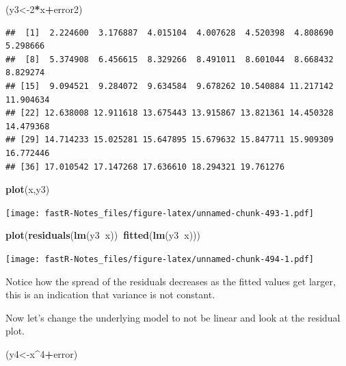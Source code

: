 \documentclass[]{book}
\newenvironment{Shaded}{\begin{snugshade}}{\end{snugshade}}
\newcommand{\KeywordTok}[1]{\textcolor[rgb]{0.13,0.29,0.53}{\textbf{#1}}}
\newcommand{\DecValTok}[1]{\textcolor[rgb]{0.00,0.00,0.81}{#1}}
\newcommand{\OperatorTok}[1]{\textcolor[rgb]{0.81,0.36,0.00}{\textbf{#1}}}
\newcommand{\NormalTok}[1]{#1}
\theoremstyle{definition}
\theoremstyle{definition}
\theoremstyle{definition}
\theoremstyle{remark}
\begin{document}
\begin{Shaded}
\begin{Highlighting}[]
\NormalTok{(y3<-}\DecValTok{2}\OperatorTok{*}\NormalTok{x}\OperatorTok{+}\NormalTok{error2)}
\end{Highlighting}
\end{Shaded}

\begin{verbatim}
##  [1]  2.224600  3.176887  4.015104  4.007628  4.520398  4.808690  5.298666
##  [8]  5.374908  6.456615  8.329266  8.491011  8.601044  8.668432  8.829274
## [15]  9.094521  9.284072  9.634584  9.678262 10.540884 11.217142 11.904634
## [22] 12.638008 12.911618 13.675443 13.915867 13.821361 14.450328 14.479368
## [29] 14.714233 15.025281 15.647895 15.679632 15.847711 15.909309 16.772446
## [36] 17.010542 17.147268 17.636610 18.294321 19.761276
\end{verbatim}

\begin{Shaded}
\begin{Highlighting}[]
\KeywordTok{plot}\NormalTok{(x,y3)}
\end{Highlighting}
\end{Shaded}

\texttt{[image: fastR-Notes\_files/figure-latex/unnamed-chunk-493-1.pdf]}

\begin{Shaded}
\begin{Highlighting}[]
\KeywordTok{plot}\NormalTok{(}\KeywordTok{residuals}\NormalTok{(}\KeywordTok{lm}\NormalTok{(y3}\OperatorTok{~}\NormalTok{x))}\OperatorTok{~}\KeywordTok{fitted}\NormalTok{(}\KeywordTok{lm}\NormalTok{(y3}\OperatorTok{~}\NormalTok{x)))}
\end{Highlighting}
\end{Shaded}

\texttt{[image: fastR-Notes\_files/figure-latex/unnamed-chunk-494-1.pdf]}

Notice how the spread of the residuals decreases as the fitted values
get larger, this is an indication that variance is not constant.

Now let's change the underlying model to not be linear and look at the
residual plot.

\begin{Shaded}
\begin{Highlighting}[]
\NormalTok{(y4<-x}\OperatorTok{^}\DecValTok{4}\OperatorTok{+}\NormalTok{error)}
\end{Highlighting}
\end{Shaded}
\end{document}
